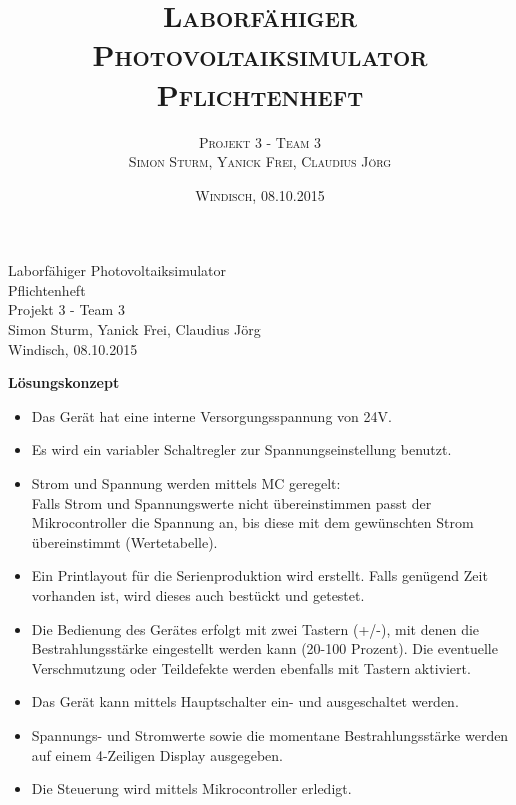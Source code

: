 \documentclass{fhnwreport}
\title{%
  \textsc{Laborfähiger Photovoltaiksimulator}\\
  \textsc{Pflichtenheft}}
\author{%
  \textsc{Projekt 3 - Team 3}\\
  \textsc{Simon Sturm, Yanick Frei,
Claudius Jörg}}
\date{%
  \textsc{Windisch, 08.10.2015}}
\begin{document}
\begin{center}
\Large Laborfähiger Photovoltaiksimulator\\
Pflichtenheft\\
\large Projekt 3 - Team 3\\
Simon Sturm, Yanick Frei, Claudius Jörg\\
Windisch, 08.10.2015
\end{center}


\textbf{Lösungskonzept}
\begin{itemize}
	\item Das Gerät hat eine interne Versorgungsspannung von 24V.
	\item Es wird ein variabler Schaltregler zur Spannungseinstellung benutzt.
	\item Strom und Spannung werden mittels MC geregelt:\\
	Falls Strom und Spannungswerte nicht übereinstimmen passt der	Mikrocontroller die Spannung an, bis diese mit dem gewünschten Strom übereinstimmt (Wertetabelle).
		\item Ein Printlayout für die Serienproduktion wird erstellt.
		Falls genügend Zeit vorhanden ist, wird dieses auch bestückt und getestet.
		\item Die Bedienung des Gerätes erfolgt mit zwei Tastern (+/-), mit denen die Bestrahlungsstärke eingestellt werden kann (20-100 Prozent). Die eventuelle Verschmutzung oder Teildefekte werden ebenfalls mit Tastern aktiviert.
		\item Das Gerät kann mittels Hauptschalter ein- und ausgeschaltet werden.
		\item Spannungs- und Stromwerte sowie die momentane Bestrahlungsstärke werden auf einem 4-Zeiligen Display ausgegeben.
		\item Die Steuerung wird mittels Mikrocontroller erledigt.%
\end{itemize}
\end{document}
